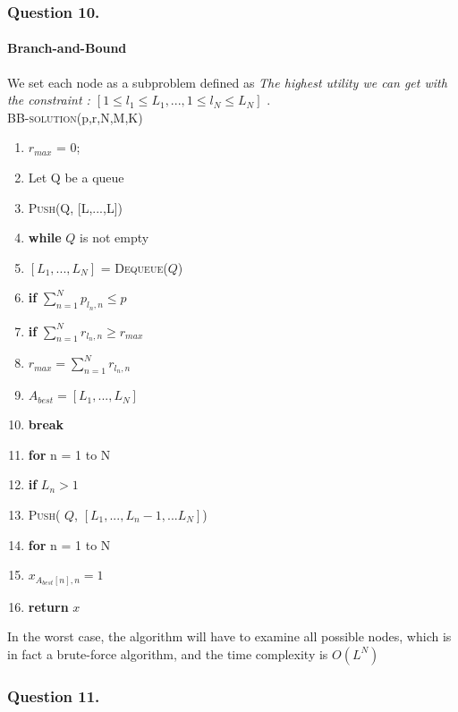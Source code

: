 \documentclass[11pt, oneside]{report}
\begin{document}
\subsubsection{Question 10. }
\paragraph{Branch-and-Bound} We set each node as a subproblem defined as \textit{The highest utility we can get with the constraint : $[1 \leq l_1 \leq L_1,...,1\leq l_N \leq L_N]$ }. \\

\noindent\textsc{BB-solution}(p,r,N,M,K)
\begin{enumerate}[1\ ]
\setlength{\topsep}{0.05ex}
\setlength{\itemsep}{0.05ex}
\item $r_{max}$ = 0;
\item Let Q be a queue
\item \textsc{Push}(Q, [L,...,L])
\item \textbf{while} $Q$ is not empty
\item \qquad $[L_1,...,L_N]$ = \textsc{Dequeue}($Q$)
\item \qquad \textbf{if} $\sum_{n=1}^{N} p_{l_n, n} \leq p$
\item \qquad \qquad \textbf{if} $\sum_{n=1}^{N} r_{l_n, n} \geq r_{max}$
\item \qquad \qquad \qquad $r_{max} = \sum_{n=1}^{N} r_{l_n, n}$
\item \qquad \qquad \qquad $A_{best} = [L_1,...,L_N]$
\item \qquad \qquad \qquad \textbf{break}
\item \qquad \textbf{for} n = 1 to N
\item \qquad \qquad \textbf{if} $L_n > 1$
\item \qquad \qquad \qquad \textsc{Push}( $Q$, $[L_1,...,L_n-1,...L_N]$)
\item \textbf{for} n = 1 to N
\item \qquad $x_{A_{best}[n],n} = 1$
\item \textbf{return} $x$
\end{enumerate}

In the worst case, the algorithm will have to examine all possible nodes, which is in fact a brute-force algorithm, and the time complexity is $O(L^N)$

\subsubsection{Question 11. }
\end{document}
